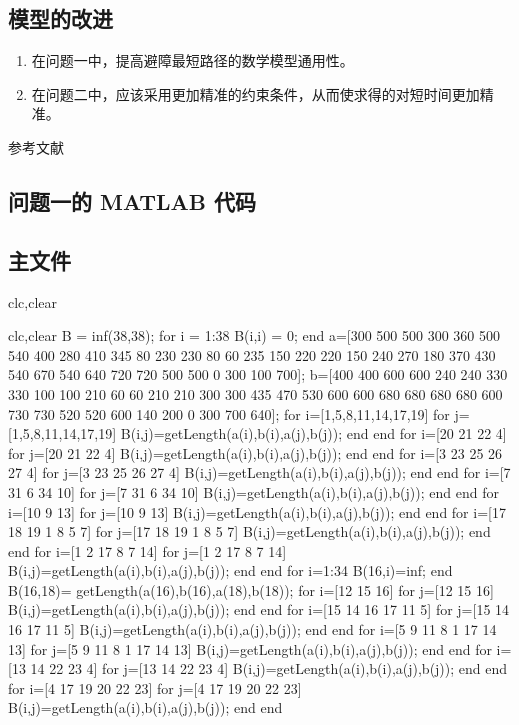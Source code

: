 \documentclass{JXUSTmodeling}
\begin{document}
\subsection{模型的改进}\label{sec:7.3}
\begin{enumerate}
  \item 在问题一中，提高避障最短路径的数学模型通用性。
  \item 在问题二中，应该采用更加精准的约束条件，从而使求得的对短时间更加精准。
\end{enumerate}

\begin{thebibliography}{99}
  参考文献
\end{thebibliography}

\begin{appendixx}
  \section{问题一的 MATLAB 代码}
  \subsection{主文件}
  \begin{matlab}
    clc,clear

clc,clear
B = inf(38,38);
for i = 1:38
    B(i,i) = 0;
end
a=[300 500 500 300 360 500 540 400 280 410 345 80 230 230 80 60 235 150 220 220 150 240 270 180 370 430 540 670 540 640 720 720 500 500 0 300 100 700]; 
b=[400 400 600 600 240 240 330 330 100 100 210 60 60 210 210  300 300 435 470 530 600 600 680 680 680 680 600 730 730 520 520 600 140 200 0 300 700 640];
for i=[1,5,8,11,14,17,19]
    for j=[1,5,8,11,14,17,19]
    B(i,j)=getLength(a(i),b(i),a(j),b(j)); 
    end
end
for i=[20 21 22 4]
    for j=[20 21 22 4]
    B(i,j)=getLength(a(i),b(i),a(j),b(j)); 
    end
end
for i=[3 23 25 26 27 4]
    for j=[3 23 25 26 27 4]
    B(i,j)=getLength(a(i),b(i),a(j),b(j)); 
    end
end
for i=[7 31 6 34 10]
    for j=[7 31 6 34 10]
    B(i,j)=getLength(a(i),b(i),a(j),b(j)); 
    end
end
for i=[10 9 13]
    for j=[10 9 13]
    B(i,j)=getLength(a(i),b(i),a(j),b(j)); 
    end
end
for i=[17 18 19 1 8 5 7]
    for j=[17 18 19 1 8 5 7]
    B(i,j)=getLength(a(i),b(i),a(j),b(j)); 
    end
end
for i=[1 2 17 8 7 14]
    for j=[1 2 17 8 7 14]
    B(i,j)=getLength(a(i),b(i),a(j),b(j)); 
    end
end
for i=1:34
    B(16,i)=inf;
end
B(16,18)= getLength(a(16),b(16),a(18),b(18));
for i=[12 15 16]
    for j=[12 15 16]
    B(i,j)=getLength(a(i),b(i),a(j),b(j)); 
    end
end
for i=[15 14 16 17 11 5]
    for j=[15 14 16 17 11 5]
    B(i,j)=getLength(a(i),b(i),a(j),b(j)); 
    end
end
for i=[5 9 11 8 1 17 14 13]
    for j=[5 9 11 8 1 17 14 13]
    B(i,j)=getLength(a(i),b(i),a(j),b(j)); 
    end
end
for i=[13 14 22 23 4]
    for j=[13 14 22 23 4]
    B(i,j)=getLength(a(i),b(i),a(j),b(j)); 
    end
end
for i=[4 17 19 20 22 23]
    for j=[4 17 19 20 22 23]
    B(i,j)=getLength(a(i),b(i),a(j),b(j)); 
    end
end


\end{matlab}
\end{appendixx}
\end{document}

